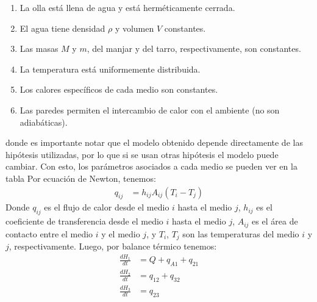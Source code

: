 \documentclass[
  11pt,
  letterpaper,
   addpoints,
   answers
  ]{exam}
\begin{document}
\begin{questions}
\begin{solution}
\begin{enumerate}
    \item La olla está llena de agua y está herméticamente cerrada.
    \item El agua tiene densidad $\rho$ y volumen $V$ constantes.
    \item Las masas $M$ y $m$, del manjar y del tarro, respectivamente, son constantes.
    \item La temperatura está uniformemente distribuida.
    \item Los calores específicos de cada medio son constantes.
    \item Las paredes permiten el intercambio de calor con el ambiente (no son adiabáticas).
\end{enumerate}

donde es importante notar que el modelo obtenido depende directamente de las hipótesis utilizadas, por lo que si se usan otras hipótesis el modelo puede cambiar. Con esto, los parámetros asociados a cada medio se pueden ver en la tabla
Por ecuación de Newton, tenemos:
\begin{align}
    q_{ij} &= h_{ij}A_{ij} (T_i - T_j)
    \end{align}    
Donde $q_{ij}$ es el flujo de calor desde el medio $i$ hasta el medio $j$, $h_{ij}$ es el coeficiente de transferencia desde el medio $i$ hasta el medio $j$, $A_{ij}$ es el área de contacto entre el medio $i$ y el medio $j$, y $T_i$, $T_j$ son las temperaturas del medio $i$ y $j$, respectivamente.
Luego, por balance térmico tenemos:
\begin{align}
    \frac{dH_1}{dt} &= Q + q_{A1} + q_{21} \tag{13} \\
    \frac{dH_2}{dt} &= q_{12} + q_{32} \tag{14} \\
    \frac{dH_3}{dt} &= q_{23} \tag{15}
    \end{align}    


\end{solution}
\end{questions}
\end{document}
